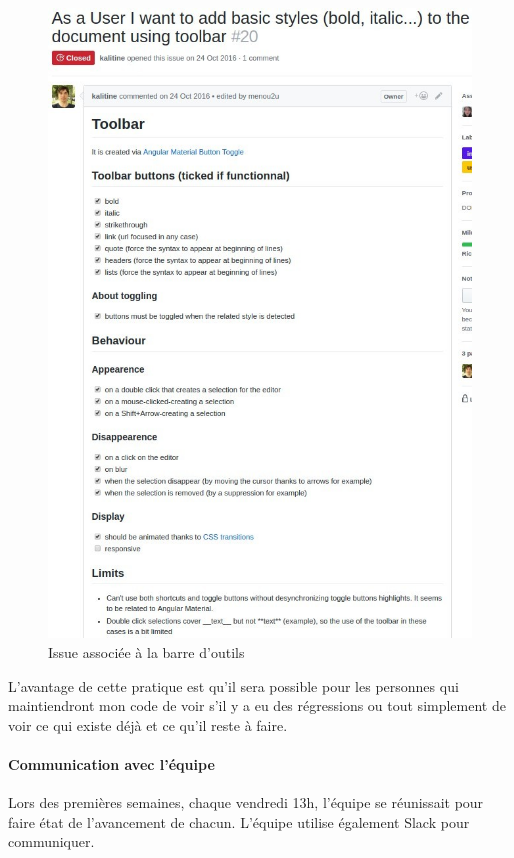 \documentclass[12pt]{article}
\begin{document}
\newpage
\begin{figure}[H]
\centering
\includegraphics[scale=0.75]{gallery/issue.jpg}
\caption[nom dans le sommaire]{Issue associée à la barre d'outils}
\label{fig:gallery2}
\end{figure}

\newpage
L'avantage de cette pratique est qu'il sera possible pour les personnes qui maintiendront mon code de voir s'il y a eu des régressions ou tout simplement de voir ce qui existe déjà et ce qu'il reste à faire.

\paragraph{Communication avec l'équipe}
Lors des premières semaines, chaque vendredi 13h, l'équipe se réunissait pour faire état de l'avancement de chacun.
L'équipe utilise également Slack \cite{slack} pour communiquer.\\
\end{document}
